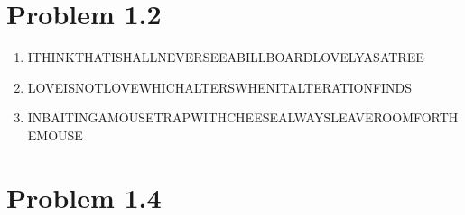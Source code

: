 \documentclass{article}
\author{Isaac Boaz}
\begin{document}
\section*{Problem 1.2}
\begin{enumerate}[label=(\alph*)]
    \item ITHINKTHATISHALLNEVERSEEABILLBOARDLOVELYASATREE
    \item LOVEISNOTLOVEWHICHALTERSWHENITALTERATIONFINDS
    \item INBAITINGAMOUSETRAPWITHCHEESEALWAYSLEAVEROOMFORTHEMOUSE
\end{enumerate}

\section*{Problem 1.4}
\end{document}
